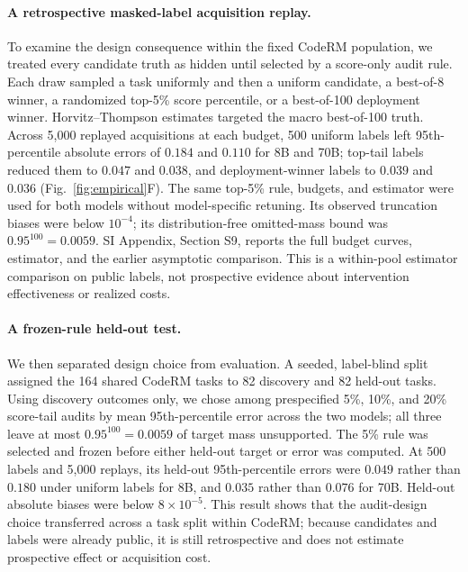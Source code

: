 \documentclass[10pt,twocolumn]{article}
\begin{document}
\paragraph{A retrospective masked-label acquisition replay.}
To examine the design consequence within the fixed CodeRM population, we treated every candidate truth as hidden until selected by a score-only audit rule. Each draw sampled a task uniformly and then a uniform candidate, a best-of-8 winner, a randomized top-5\% score percentile, or a best-of-100 deployment winner. Horvitz--Thompson estimates targeted the macro best-of-100 truth. Across 5,000 replayed acquisitions at each budget, 500 uniform labels left 95th-percentile absolute errors of $0.184$ and $0.110$ for 8B and 70B; top-tail labels reduced them to $0.047$ and $0.038$, and deployment-winner labels to $0.039$ and $0.036$ (Fig.~\ref{fig:empirical}F). The same top-5\% rule, budgets, and estimator were used for both models without model-specific retuning. Its observed truncation biases were below $10^{-4}$; its distribution-free omitted-mass bound was $0.95^{100}=0.0059$. SI Appendix, Section S9, reports the full budget curves, estimator, and the earlier asymptotic comparison. This is a within-pool estimator comparison on public labels, not prospective evidence about intervention effectiveness or realized costs.

\paragraph{A frozen-rule held-out test.}
We then separated design choice from evaluation. A seeded, label-blind split assigned the 164 shared CodeRM tasks to 82 discovery and 82 held-out tasks. Using discovery outcomes only, we chose among prespecified 5\%, 10\%, and 20\% score-tail audits by mean 95th-percentile error across the two models; all three leave at most $0.95^{100}=0.0059$ of target mass unsupported. The 5\% rule was selected and frozen before either held-out target or error was computed. At 500 labels and 5,000 replays, its held-out 95th-percentile errors were $0.049$ rather than $0.180$ under uniform labels for 8B, and $0.035$ rather than $0.076$ for 70B. Held-out absolute biases were below $8\times10^{-5}$. This result shows that the audit-design choice transferred across a task split within CodeRM; because candidates and labels were already public, it is still retrospective and does not estimate prospective effect or acquisition cost.
\end{document}
